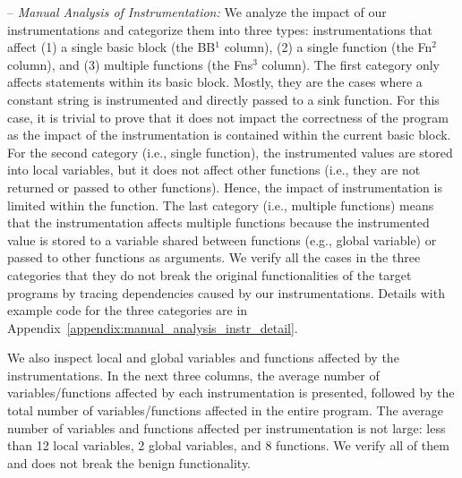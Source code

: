 -- \textit{Manual Analysis of Instrumentation:} 
We analyze the impact of our instrumentations and categorize them into three types: instrumentations that affect (1) a single basic block (the BB$^1$ column), (2) a single function (the Fn$^2$ column), and (3) multiple functions (the Fns$^3$ column).
The first category only affects statements within its basic block. 
Mostly, they are the cases where a constant string is instrumented and directly passed to a sink function. For this case, it is trivial to prove that it does not impact the correctness of the program as the impact of the instrumentation is contained within the current basic block.
For the second category (i.e., single function), the instrumented values are stored into local variables, but it does not affect other functions (i.e., they are not returned or passed to other functions). Hence, the impact of instrumentation is limited within the function. 
The last category (i.e., multiple functions) means that the instrumentation affects multiple functions because the instrumented value is stored to a variable shared between functions (e.g., global variable) or passed to other functions as arguments. 
We verify all the cases in the three categories that they do not break the original functionalities of the target programs by tracing dependencies caused by our instrumentations.
Details with example code for the three categories are in Appendix~\ref{appendix:manual_analysis_instr_detail}. 


We also inspect local and global variables and functions affected by the instrumentations.
In the next three columns, the average number of variables/functions affected by each instrumentation is presented, followed by the total number of variables/functions affected in the entire program.
The average number of variables and functions affected per instrumentation is not large: less than 12 local variables, 2 global variables, and 8 functions. 
We verify all of them and \sysname does not break the benign functionality.



